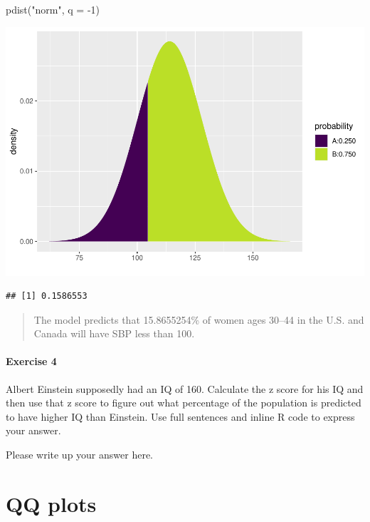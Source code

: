 \documentclass[
]{book}
\newenvironment{Shaded}{\begin{snugshade}}{\end{snugshade}}
\newcommand{\AttributeTok}[1]{\textcolor[rgb]{0.77,0.63,0.00}{#1}}
\newcommand{\DecValTok}[1]{\textcolor[rgb]{0.00,0.00,0.81}{#1}}
\newcommand{\FunctionTok}[1]{\textcolor[rgb]{0.00,0.00,0.00}{#1}}
\newcommand{\NormalTok}[1]{#1}
\newcommand{\SpecialCharTok}[1]{\textcolor[rgb]{0.00,0.00,0.00}{#1}}
\newcommand{\StringTok}[1]{\textcolor[rgb]{0.31,0.60,0.02}{#1}}
\begin{document}
\begin{Shaded}
\begin{Highlighting}[]
\FunctionTok{pdist}\NormalTok{(}\StringTok{"norm"}\NormalTok{, }\AttributeTok{q =} \SpecialCharTok{{-}}\DecValTok{1}\NormalTok{)}
\end{Highlighting}
\end{Shaded}

\includegraphics{intro_stats_files/figure-latex/unnamed-chunk-357-1.pdf}

\begin{verbatim}
## [1] 0.1586553
\end{verbatim}

\begin{quote}
The model predicts that 15.8655254\% of women ages 30--44 in the U.S. and Canada will have SBP less than 100.
\end{quote}

\hypertarget{exercise-4-7}{%
\paragraph*{Exercise 4}\label{exercise-4-7}}

Albert Einstein supposedly had an IQ of 160. Calculate the z score for his IQ and then use that z score to figure out what percentage of the population is predicted to have higher IQ than Einstein. Use full sentences and inline R code to express your answer.

Please write up your answer here.

\hypertarget{normal-qq}{%
\section{QQ plots}\label{normal-qq}}
\end{document}

